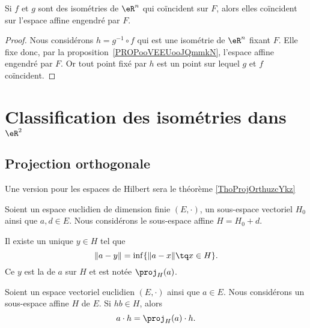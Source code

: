 \begin{corollary}       \label{CORooZHZZooDgTzsW}
	Si \( f\) et \( g\) sont des isométries de \( \eR^n\) qui coïncident sur \( F\), alors elles coïncident sur l'espace affine engendré par \( F\).
\end{corollary}

\begin{proof}
	Nous considérons \( h=g^{-1}\circ f\) qui est une isométrie de \( \eR^n\) fixant \( F\). Elle fixe donc, par la proposition~\ref{PROPooVEEUooJQmmkN}, l'espace affine engendré par $F$. Or tout point fixé par \( h\) est un point sur lequel \( g\) et \( f\) coïncident.
\end{proof}

\section{Classification des isométries dans \( \eR^2\)}

\subsection{Projection orthogonale}

Une version pour les espaces de Hilbert sera le théorème \ref{ThoProjOrthuzcYkz}
\begin{propositionDef}      \label{DEFooHXJTooNPyDFQ}
    Soient un espace euclidien de dimension finie \( (E,\cdot)\), un sous-espace vectoriel \( H_0\) ainsi que \( a,d\in E\). Nous considérons le sous-espace affine \( H=H_0+d\).

    Il existe un unique \( y\in H\) tel que
    \begin{equation}
        \| a-y  \|=\inf\{ \| a-x \|\tq x\in H \}.
    \end{equation}
    Ce \( y\) est la  de \( a\) sur \( H\) et est notée \( \proj_H(a)\).
\end{propositionDef}

\begin{lemma}       \label{LEMooXZMFooOPTjNx}
    Soient un espace vectoriel euclidien \( (E,\cdot)\) ainsi que \( a\in E\). Nous considérons un sous-espace affine \( H\) de \( E\). Si \(hb\in H\), alors
    \begin{equation}
        a\cdot h=\proj_H(a)\cdot h.
    \end{equation}
\end{lemma}

